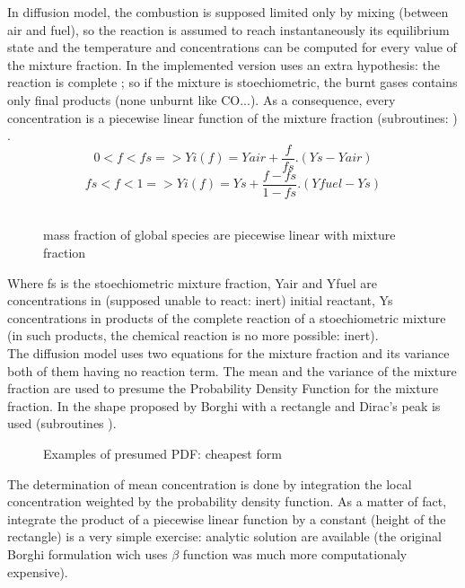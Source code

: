 In diffusion model, the combustion is supposed limited only by mixing
({\small between air and fuel}), so the reaction is assumed to reach
instantaneously its equilibrium state and the temperature and
concentrations can be computed for every value of the mixture
fraction. In \CS the implemented version uses an extra hypothesis:
the reaction is complete ; so if the mixture is stoechiometric, the
burnt gases contains only final products ({\small none unburnt like
CO...}). As a consequence, every concentration is a piecewise linear
function of the mixture fraction (subroutines: ) .\\
\begin{equation}
0<f<fs => Yi(f) = Yair + \frac{f}{fs} . (Ys-Yair)
\end{equation}
\begin{equation}
fs<f<1 => Yi(f) = Ys + \frac{f-fs}{1-fs} . (Yfuel-Ys)
\end{equation}\\
\begin{figure}[h]
\caption{mass fraction of global species are piecewise linear with mixture fraction}
\end{figure}
Where fs is the stoechiometric mixture fraction, Yair and Yfuel are
concentrations in ({\small supposed unable to react: inert}) initial
reactant, Ys concentrations in products of the complete reaction of a
stoechiometric mixture ({\small in such products, the chemical
reaction is no more possible: inert}).\\

The diffusion model uses two equations for the mixture fraction and
its variance both of them having no reaction term. The mean and the
variance of the mixture fraction are used to presume the Probability
Density Function for the mixture fraction. In \CS the shape proposed
by Borghi \cite{4} with a rectangle and Dirac's peak is used
(subroutines ).\\

\begin{figure}[h]
\caption{Examples of presumed PDF: cheapest form}
\end{figure}
The determination of mean concentration is done by integration the
local concentration weighted by the probability density function. As a
matter of fact, integrate the product of a piecewise linear function
by a constant ({\small height of the rectangle}) is a very simple
exercise: analytic solution are available ({\small the original
Borghi formulation \cite{3} wich uses $\beta$ function was much more
computationaly expensive}).

